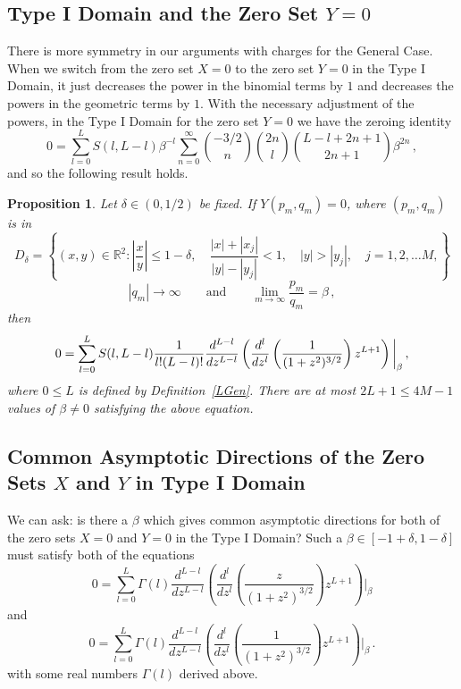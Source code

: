 \documentclass{article}
\newtheorem{prop}[thm]{Proposition}
\theoremstyle{remark}
\numberwithin{equation}{section}
\begin{document}
\subsection{Type I Domain and the Zero Set $Y=0$}\label{GenYI}

There is more symmetry in our arguments with charges for the General Case. When we switch from the zero set $X= 0$ to the zero set $Y=0$ in the Type I Domain, 
it just decreases the power in the binomial terms by $1$ and decreases the powers in the geometric terms by $1$. With the necessary adjustment of the powers,
in the Type I Domain for the zero set $Y=0$ we have the zeroing identity 
$$0 = \sum_{l=0}^L S(l,L-l) \beta^{-l} \sum_{n=0}^\infty \binom{-3/2}{n} \binom{2n}l \binom{L-l+2n+1}{2n+1} \beta^{2n}\,,$$
and so the following result holds. 

\begin{prop}\label{GenYTypeI} Let $\delta \in (0,1/2)$ be fixed. If $Y(p_m,q_m) = 0$, where $(p_m,q_m)$ is in 
$$ D_{\delta} = \left\{(x,y) \in {\mathbb R}^2: \left| \frac xy \right| \leq 1-\delta, \quad \frac{|x|+|x_j|}{|y|-|y_j|} < 1, \quad |y| > |y_j|, \quad j=1,2,\ldots M,\right\}$$
$$|q_m| \rightarrow \infty \qquad \text{and} \qquad \lim_{m \rightarrow \infty}{\frac{p_m}{q_m}} = \beta\,,$$
then
\begin{equation} \notag
0 = \sum_{l=0}^L S(l,L-l) \frac{1}{l!(L-l)!} 
\frac{d^{L-l}}{dz^{L-l}} \left( \frac{d^l}{dz^l} \left( \frac{1}{(1 +z^2)^{3/2}} \right)z^{L+1} \right)\bigg |_\beta\,,
\end{equation}
where $0 \leq L$ is defined by Definition~\ref{LGen}.
There are at most $2L+1 \leq 4M-1$ values of $\beta \neq 0$ satisfying the above equation.
\end{prop}

\subsection{Common Asymptotic Directions of the Zero Sets $X$ and $Y$ in Type I Domain}\label{COMMON}

We can ask: is there a $\beta$ which gives common asymptotic directions for both of the zero sets $X=0$ and $Y=0$ in the Type I Domain?    
Such a $\beta \in [-1+\delta,1-\delta]$ must satisfy both of the equations 
$$0 = \sum_{l=0}^L \Gamma(l) 
\frac{d^{L-l}}{dz^{L-l}} \left( \frac{d^l}{dz^l} \left( \frac {z}{(1 +z^2)^{3/2}} \right)z^{L+1} \right)\bigg |_\beta$$ 
and
$$0 = \sum_{l=0}^L \Gamma(l)
\frac{d^{L-l}}{dz^{L-l}} \left( \frac{d^l}{dz^l} \left( \frac{1}{(1 +z^2)^{3/2}} \right)z^{L+1} \right)\bigg |_\beta\,.$$ 
with some real numbers $\Gamma(l)$ derived above.
\end{document}
